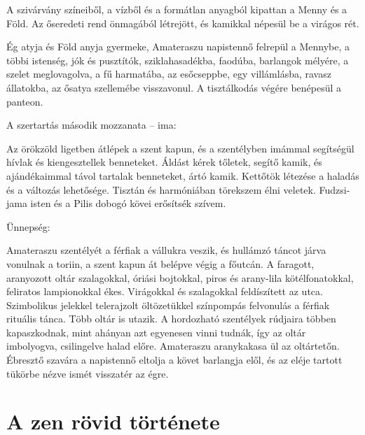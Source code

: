 A szivárvány színeiből, a vízből és a formátlan anyagból kipattan a
Menny és a Föld. Az őseredeti rend önmagából létrejött, és kamikkal
népesül be a virágos rét.

Ég atyja és Föld anyja gyermeke, Amateraszu napistennő felrepül a
Mennybe, a többi istenség, jók és pusztítók, sziklahasadékba, faodúba,
barlangok mélyére, a szelet meglovagolva, a fű harmatába, az esőcseppbe,
egy villámlásba, ravasz állatokba, az ősatya szellemébe visszavonul.
A tisztálkodás végére benépesül a panteon.

A szertartás második mozzanata -- ima:

Az örökzöld ligetben átlépek a szent kapun, és a szentélyben imámmal
segítségül hívlak és kiengesztellek benneteket. Áldást kérek tőletek,
segítő kamik, és ajándékaimmal távol tartalak benneteket, ártó
kamik. Kettőtök létezése a haladás és a változás lehetősége. Tisztán
és harmóniában törekszem élni veletek. Fudzsi-jama isten és a Pilis
dobogó kövei erősítsék szívem.

Ünnepség:

Amateraszu szentélyét a férfiak a vállukra veszik, és hullámzó táncot
járva vonulnak a toriin, a szent kapun át belépve végig a főutcán.
A faragott, aranyozott oltár szalagokkal, óriási bojtokkal, piros és
arany-lila kötélfonatokkal, feliratos lampionokkal ékes. Virágokkal és
szalagokkal feldíszített az utca. Szimbolikus jelekkel telerajzolt
öltözetükkel színpompás felvonulás a férfiak rituális tánca. Több oltár is
utazik. A hordozható szentélyek rúdjaira többen kapaszkodnak, mint
ahányan azt egyenesen vinni tudnák, így az oltár imbolyogva, csilingelve
halad előre. Amateraszu aranykakasa ül az oltártetőn. Ébresztő
szavára a napistennő eltolja a követ barlangja elől, és az eléje tartott
tükörbe nézve ismét visszatér az égre.

\section{A zen rövid története}

